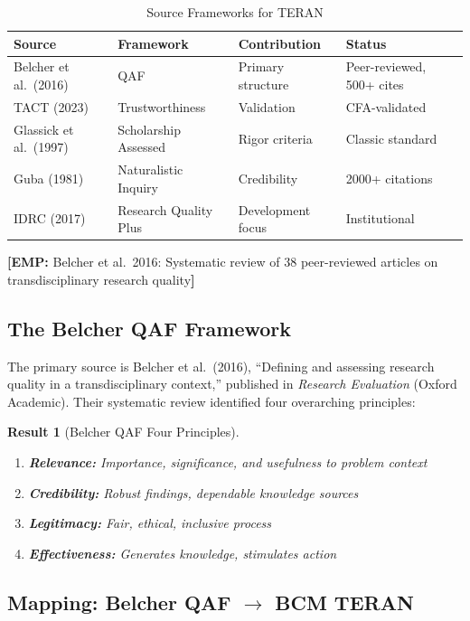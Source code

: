 \documentclass[11pt,a4paper]{article}
\newcommand{\tagEMP}[1]{\textcolor{empgreen}{\textbf{[EMP:} #1\textbf{]}}}
\newtheorem{result}{Result}[section]
\begin{document}
\begin{table}[h]
\centering
\caption{Source Frameworks for TERAN}
\label{tab:sources}
\begin{tabular}{p{3.5cm}p{4cm}p{3cm}p{3cm}}
\toprule
\textbf{Source} & \textbf{Framework} & \textbf{Contribution} & \textbf{Status} \\
\midrule
Belcher et al.\ (2016) & QAF & Primary structure & Peer-reviewed, 500+ cites \\
TACT (2023) & Trustworthiness & Validation & CFA-validated \\
Glassick et al.\ (1997) & Scholarship Assessed & Rigor criteria & Classic standard \\
Guba (1981) & Naturalistic Inquiry & Credibility & 2000+ citations \\
IDRC (2017) & Research Quality Plus & Development focus & Institutional \\
\bottomrule
\end{tabular}
\end{table}

\tagEMP{Belcher et al.\ 2016: Systematic review of 38 peer-reviewed articles on transdisciplinary research quality}

\subsection{The Belcher QAF Framework}

The primary source is Belcher et al.\ (2016), ``Defining and assessing research quality in a transdisciplinary context,'' published in \emph{Research Evaluation} (Oxford Academic). Their systematic review identified four overarching principles:

\begin{result}[Belcher QAF Four Principles]
\label{res:belcher}
\begin{enumerate}
    \item \textbf{Relevance:} Importance, significance, and usefulness to problem context
    \item \textbf{Credibility:} Robust findings, dependable knowledge sources
    \item \textbf{Legitimacy:} Fair, ethical, inclusive process
    \item \textbf{Effectiveness:} Generates knowledge, stimulates action
\end{enumerate}
\end{result}

\subsection{Mapping: Belcher QAF $\rightarrow$ BCM TERAN}
\end{document}
